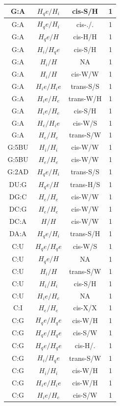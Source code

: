 \begin{center}
\begin{longtable}{c|c|c|c}
G:A & $H_qe/H_i$ & cis-S/H & 1 \\  \hline
G:A & $H_qe/H_i$ & cis-./. & 1 \\  \hline
G:A & $H_qe/H$ & cis-H/H & 1 \\  \hline
G:A & $H_i/H_qe$ & cis-S/H & 1 \\  \hline
G:A & $H_i/H$ & NA & 1 \\  \hline
G:A & $H_i/H$ & cis-W/W & 1 \\  \hline
G:A & $H_ie/H_ie$ & trans-S/S & 1 \\  \hline
G:A & $H_ie/H_e$ & trans-W/H & 1 \\  \hline
G:A & $H_ie/H_e$ & cis-S/H & 1 \\  \hline
G:A & $H_e/H_ie$ & cis-W/S & 1 \\  \hline
G:A & $H_e/H_e$ & trans-S/W & 1 \\  \hline
G:5BU & $H_i/H_i$ & cis-W/W & 1 \\  \hline
G:5BU & $H_e/H_e$ & cis-W/W & 1 \\  \hline
G:2AD & $H_qe/H_i$ & trans-S/S & 1 \\  \hline
DU:G & $H_qe/H$ & trans-H/S & 1 \\  \hline
DG:C & $H_e/H_e$ & cis-W/W & 1 \\  \hline
DC:G & $H_e/H_e$ & cis-W/W & 1 \\  \hline
DC:A & $H/H$ & cis-W/W & 1 \\  \hline
DA:A & $H_qe/H_i$ & trans-S/H & 1 \\  \hline
C:U & $H_qe/H_qe$ & cis-W/S & 1 \\  \hline
C:U & $H_qe/H$ & NA & 1 \\  \hline
C:U & $H_i/H$ & trans-S/W & 1 \\  \hline
C:U & $H_i/H_i$ & cis-S/H & 1 \\  \hline
C:U & $H_ie/H_e$ & NA & 1 \\  \hline
C:I & $H_e/H_e$ & cis-X/X & 1 \\  \hline
C:G & $H_qe/H_qe$ & cis-W/H & 1 \\  \hline
C:G & $H_qe/H_qe$ & cis-S/W & 1 \\  \hline
C:G & $H_qe/H_qe$ & cis-H/. & 1 \\  \hline
C:G & $H_i/H_qe$ & trans-S/W & 1 \\  \hline
C:G & $H_i/H_i$ & cis-W/H & 1 \\  \hline
C:G & $H_ie/H_ie$ & cis-W/H & 1 \\  \hline
C:G & $H_ie/H_e$ & cis-S/W & 1 \\  \hline

\end{longtable}
\end{center}
